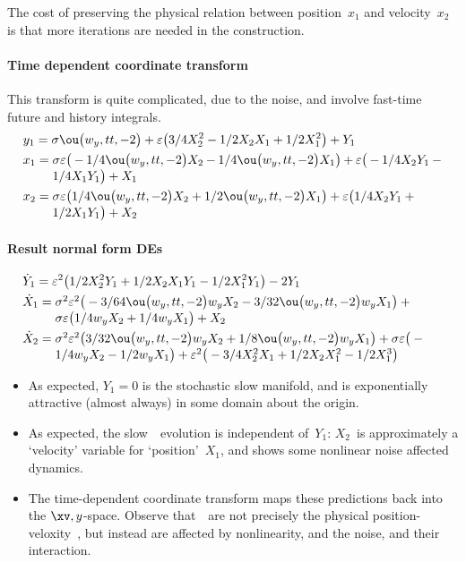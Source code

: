 The cost of preserving the physical relation between position~\(x_1\) and velocity~\(x_2\) is that more iterations are needed in the construction.




\paragraph{Time dependent coordinate transform}
This transform is quite complicated, due to the noise, and involve fast-time future and history integrals. 
\begin{align*}&
y_{1}=\sigma  \ou\big(w_{y},tt,-2\big)+\eps \big(3/4 X_{2}^{2}-1/2 X_{2}
 X_{1}+1/2 X_{1}^{2}\big)+Y_{1}
\\&
x_{1}=\ParMath{\sigma  \eps \big(-1/4 \ou\big(w_{y},tt,-2\big) X_{2}-1/4 \ou\big(
w_{y},tt,-2\big) X_{1}\big)+\eps \big(-1/4 X_{2} Y_{1}-1/4 X_{1} Y_{1}
\big)+X_{1}
}
\\&
x_{2}=\ParMath{\sigma  \eps \big(1/4 \ou\big(w_{y},tt,-2\big) X_{2}+1/2 \ou\big(w
_{y},tt,-2\big) X_{1}\big)+\eps \big(1/4 X_{2} Y_{1}+1/2 X_{1} Y_{1}
\big)+X_{2}
}
\end{align*}

\paragraph{Result normal form DEs}
\begin{align*}&
\dot Y_{1}=\eps^{2} \big(1/2 X_{2}^{2} Y_{1}+1/2 X_{2} X_{1} Y_{1}-1/2 X
_{1}^{2} Y_{1}\big)-2 Y_{1}
\\&
\dot X_{1}=\ParMath{\sigma ^{2} \eps^{2} \big(-3/64 \ou\big(w_{y},tt,-2\big) w_{y
} X_{2}-3/32 \ou\big(w_{y},tt,-2\big) w_{y} X_{1}\big)+\sigma  \eps 
\big(1/4 w_{y} X_{2}+1/4 w_{y} X_{1}\big)+X_{2}
}
\\&
\dot X_{2}=\ParMath{\sigma ^{2} \eps^{2} \big(3/32 \ou\big(w_{y},tt,-2\big) w_{y}
 X_{2}+1/8 \ou\big(w_{y},tt,-2\big) w_{y} X_{1}\big)+\sigma  \eps \big(-
1/4 w_{y} X_{2}-1/2 w_{y} X_{1}\big)+\eps^{2} \big(-3/4 X_{2}^{2} X_{1}+
1/2 X_{2} X_{1}^{2}-1/2 X_{1}^{3}\big)
}
\end{align*}
\begin{itemize}
\item As expected, \(Y_1=0\) is the stochastic slow manifold, and is exponentially attractive (almost always) in some domain about the origin.
\item As expected, the slow~\Xv\ evolution is independent of~\(Y_1\): \(X_2\)~is approximately a `velocity' variable for `position'~\(X_1\), and shows some nonlinear noise affected dynamics.
\item The time-dependent coordinate transform maps these predictions back into the \(\xv,y\)-space.  Observe that~\Xv\ are not precisely the physical position-veloxity~\xv, but instead are affected by nonlinearity, and the noise, and their interaction.
\end{itemize}


